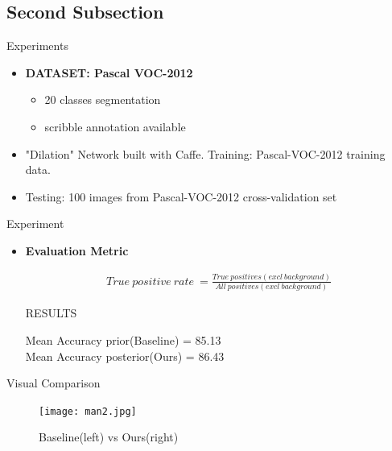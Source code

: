 \documentclass{beamer}
\begin{document}
	\subsection{Second Subsection}
	
	\begin{frame}{ Experiments}
		\begin{itemize}
			\item{
			\textbf{DATASET: Pascal VOC-2012} \\
			\begin{itemize}
				\item 20 classes segmentation
				\item scribble annotation available \newline
			\end{itemize}	
				
			}
		\item {
			"Dilation" Network built with Caffe. \newline
			Training: Pascal-VOC-2012 training data.
			\newline
		}			
		\item {
				Testing: 100 images from Pascal-VOC-2012 cross-validation set
			}
		\end{itemize}
	\end{frame}
	
	
	\begin{frame}{Experiment}
		\begin{itemize}
			\item{} \textbf{Evaluation Metric}
			
			\begin{align*}
			True \ positive \ rate \ = \frac{True \ positives(excl \  background)}{All \  positives(excl\ background)}
			\end{align*}
			
			\begin{block}{RESULTS}
			\begin{center}
				Mean Accuracy prior(Baseline) = 85.13 \\
				Mean Accuracy posterior(Ours) = 86.43					
			\end{center}
		\end{block}
		\end{itemize}
	\end{frame}	


	\begin{frame}{Visual Comparison}
			\begin{figure}[H]
				\begin{center}
					\texttt{[image: man2.jpg]}
					\caption{Baseline(left) vs Ours(right)}
				\end{center}			
			\end{figure}		
		\end{frame}
		
\end{document}
